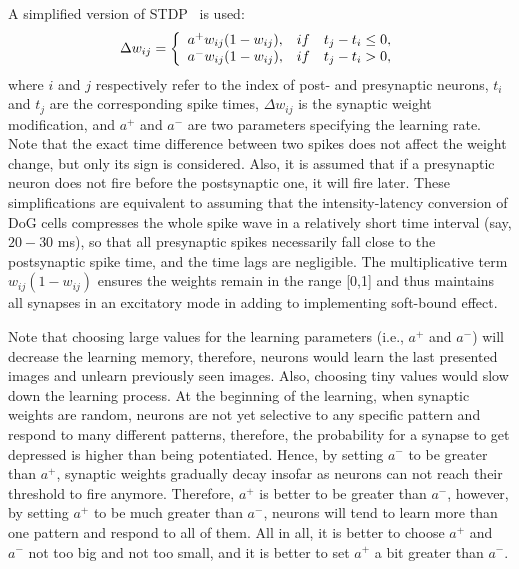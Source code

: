 \documentclass[preprint,5p,12pt,twocolumn]{article}
\begin{document}
A simplified version of STDP~\cite{masquelier2007unsupervised} is used:
\begin{eqnarray}
\label{eq:STDP}
\Delta w_{ij}=
\left\{ 
  \begin{array}{l l l}
    a^{+}w_{ij}(1-w_{ij}),&  if & t_{j}-t_{i}\leq 0, \\
    a^{-}w_{ij}(1-w_{ij}),&  if & t_{j}-t_{i} > 0,
  \end{array} \right.
\end{eqnarray}
where $ i $ and $ j $ respectively refer to the index of post- and presynaptic neurons,
$t_i$ and $t_j$ are the corresponding spike times, $\Delta w_{ij}$ is the synaptic weight modification, and $a^{+}$ and $a^{-}$ are two parameters specifying the
learning rate. Note that the exact time difference between two spikes does not affect the weight change, but only its sign is considered. Also, it is assumed that if a presynaptic neuron does not fire before the postsynaptic one, it will fire later. These simplifications are equivalent to assuming that the intensity-latency conversion of DoG cells compresses the whole spike wave in a relatively short time interval (say, $20-30$ ms), so that all presynaptic spikes necessarily fall close to the postsynaptic spike time, and the time lags are negligible. The multiplicative term $w_{ij}(1-w_{ij})$ ensures the weights remain in the range [0,1] and thus maintains all synapses in an excitatory mode in adding to implementing soft-bound effect. 

Note that choosing large values for the learning parameters (i.e., $a^{+}$ and $a^{-}$) will decrease the learning memory, therefore, neurons would learn the last presented images and unlearn previously seen images. Also, choosing tiny values would slow down the learning process. At the beginning of the learning, when synaptic weights are random, neurons are not yet selective to any specific pattern and respond to many different patterns, therefore, the probability for a synapse to get depressed is higher than being potentiated. Hence, by setting $a^{-}$ to be greater than $a^{+}$, synaptic weights gradually decay insofar as neurons can not reach their threshold to fire anymore. Therefore, $a^{+}$ is better to be greater than $a^{-}$, however, by setting $a^{+}$ to be much greater than $a^{-}$, neurons will tend to learn more than one pattern and respond to all of them. All in all, it is better to choose $a^{+}$ and $a^{-}$ not too big and not too small, and it is better to set $a^{+}$ a bit greater than $a^{-}$. 
\end{document}
